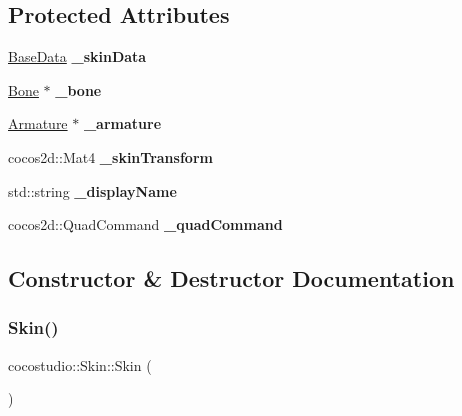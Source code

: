 \subsection*{Protected Attributes}
\begin{DoxyCompactItemize}
\item 
\mbox{\label{classcocostudio_1_1Skin_a45d7b1406f07e4dcc6970005854d2799}} 
\hyperlink{classcocostudio_1_1BaseData}{Base\+Data} {\bfseries \+\_\+skin\+Data}
\item 
\mbox{\label{classcocostudio_1_1Skin_afee1d7af47d043593c582fe9b2cd7395}} 
\hyperlink{classcocostudio_1_1Bone}{Bone} $\ast$ {\bfseries \+\_\+bone}
\item 
\mbox{\label{classcocostudio_1_1Skin_ad3bef743c0f1b3d2b526bd9416c38bd8}} 
\hyperlink{classcocostudio_1_1Armature}{Armature} $\ast$ {\bfseries \+\_\+armature}
\item 
\mbox{\label{classcocostudio_1_1Skin_a939a9e1b29e913f2054e0f2f28561724}} 
cocos2d\+::\+Mat4 {\bfseries \+\_\+skin\+Transform}
\item 
\mbox{\label{classcocostudio_1_1Skin_a61ae48834335fd11223167a9197fac1c}} 
std\+::string {\bfseries \+\_\+display\+Name}
\item 
\mbox{\label{classcocostudio_1_1Skin_af05ac129026254d3f2e7a1d713af224e}} 
cocos2d\+::\+Quad\+Command {\bfseries \+\_\+quad\+Command}
\end{DoxyCompactItemize}


\subsection{Constructor \& Destructor Documentation}
\mbox{\label{classcocostudio_1_1Skin_a1df1a70d607e83c3494408ae4a2b0698}} 
\subsubsection{\texorpdfstring{Skin()}{Skin()}\hspace{0.1cm}{\footnotesize\ttfamily [1/2]}}
{\footnotesize\ttfamily cocostudio\+::\+Skin\+::\+Skin (\begin{DoxyParamCaption}{ }\end{DoxyParamCaption})}

